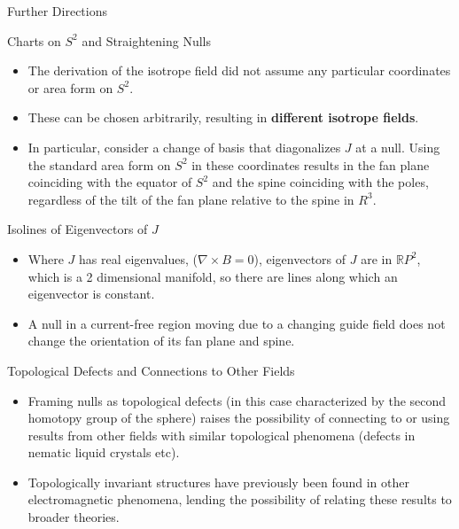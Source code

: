 \documentclass[final]{beamer}
\newlength{\onecolwid}
\begin{document}
\begin{frame}[t]
\begin{columns}[t]
\begin{column}{\onecolwid}
\begin{block}{\huge Further Directions}
  \begin{block}{Charts on $S^2$ and Straightening Nulls}
    \begin{itemize}
      \item The derivation of the isotrope field did not assume
        any particular coordinates or area form on $S^2$.
      \item These can be chosen arbitrarily, resulting in \textbf{different isotrope fields}.
      \item In particular, consider a change of basis that diagonalizes $J$ at a null.
        Using the standard area form on $S^2$ in these coordinates results in the fan plane
        coinciding with the equator of $S^2$ and the spine coinciding with the poles,
        regardless of the tilt of the fan plane relative to the spine in $R^3$.
    \end{itemize}
  \end{block}

  \begin{block}{Isolines of Eigenvectors of $J$}
    \begin{itemize}
      \item Where $J$ has real eigenvalues, ($\nabla \times B=0$),
        eigenvectors of $J$ are in $\mathbb{R}P^2$, which is a 2 dimensional manifold,
        so there are lines along which an eigenvector is constant.
      \item A null in a current-free region
        moving due to a changing guide field does not change the orientation of
        its fan plane and spine.
    \end{itemize}
  \end{block}

  \begin{block}{Topological Defects and Connections to Other Fields}
    \begin{itemize}
      \item Framing nulls as topological defects
        (in this case characterized by the second homotopy group of the sphere)
        raises the possibility of connecting to or using results from
        other fields with similar topological phenomena
        (defects in nematic liquid crystals\cite{alexander2012nematic} etc).
      \item Topologically invariant structures have previously been
        found in other electromagnetic phenomena, lending the possibility
        of relating these results to broader theories.\cite{thompson2014hopfions,ranada1992em}
    \end{itemize}
  \end{block}  


\end{block}
\end{column}
\end{columns}
\end{frame}
\end{document}
